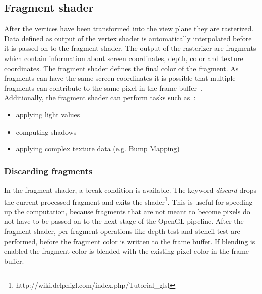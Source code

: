 \subsection{Fragment shader}	
After the vertices have been transformed into the view plane they are rasterized. Data defined as output of the vertex shader is automatically interpolated before it is passed on to the fragment shader. The output of the rasterizer are fragments which contain information about screen coordinates, depth, color and texture coordinates. The fragment shader defines the final color of the fragment. As fragments can have the same screen coordinates it is possible that multiple fragments can contribute to the same pixel in the frame buffer~\cite{book:computerGraphicsHill}.\\
Additionally, the fragment shader can perform tasks such as~\cite{book:computerGraphicsHill}: %
\begin{itemize}
	\item applying light values
	\item computing shadows
	\item applying complex texture data (e.g. Bump Mapping)
\end{itemize}

\subsubsection{Discarding fragments}
In the fragment shader, a break condition is available. The keyword \emph{discard} drops the current processed fragment and exits the shader\footnote{http://wiki.delphigl.com/index.php/Tutorial{\_}glsl}. This is useful for speeding up the computation, because fragments that are not meant to become pixels do not have to be passed on to the next stage of the OpenGL pipeline. After the fragment shader, per-fragment-operations like depth-test and stencil-test are performed, before the fragment color is written to the frame buffer. If blending is enabled the fragment color is blended with the existing pixel color in the frame buffer.